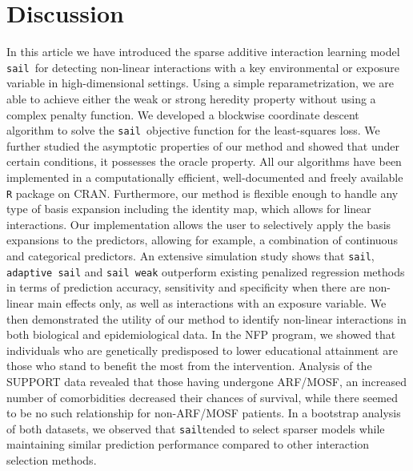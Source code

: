 \documentclass[useAMS,usenatbib,referee]{biom}
\newcommand{\sail}{\texttt{sail}}
\begin{document}



\section{Discussion} \label{sec:sail_discussion}

In this article we have introduced the sparse additive interaction learning model \sail ~for detecting non-linear interactions with a key environmental or exposure variable in high-dimensional settings.
Using a simple reparametrization, we are able to achieve either the weak or strong heredity property without using a complex penalty function. 
We developed a blockwise coordinate descent algorithm to solve the \sail ~objective function  for the least-squares loss.
We further studied the asymptotic properties of our method and showed that under certain conditions, it possesses the oracle property.
All our algorithms have been implemented in a computationally efficient, well-documented and freely available \texttt{R} package on CRAN.
Furthermore, our method is flexible enough to handle any type of basis expansion including the identity map, which allows for linear interactions.
Our implementation allows the user to selectively apply the basis expansions to the predictors, allowing for example, a combination of continuous and categorical predictors.
An extensive simulation study shows that \sail, \texttt{adaptive sail} and \texttt{sail weak} outperform existing penalized regression methods in terms of prediction accuracy, sensitivity and specificity when there are non-linear main effects only, as well as interactions with an exposure variable.
We then demonstrated the utility of our method to identify non-linear interactions in both biological and epidemiological data. 
In the NFP program, we showed that individuals who are genetically predisposed to lower educational attainment are those who stand to benefit the most from the intervention. 
Analysis of the SUPPORT data revealed that those having undergone ARF/MOSF, an increased number of comorbidities decreased their chances of survival, while there seemed to be no such relationship for non-ARF/MOSF patients. 
In a bootstrap analysis of both datasets, we observed that \sail tended to select sparser models while maintaining similar prediction performance compared to other interaction selection methods. 
\end{document}
